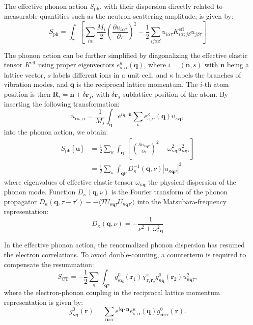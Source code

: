 \documentclass[%
 reprint,
superscriptaddress,
 amsmath,amssymb,
 aps,
prx,
]{revtex4-2}
\newcommand{\br}{\mathbf{r}}
\newcommand{\bR}{\mathbf{R}}
\newcommand{\bq}{\mathbf{q}}
\newcommand{\bn}{\mathbf{n}}
\newcommand{\bu}{\mathbf{u}}
\newcommand{\txe}{\text{e}}
\newcommand{\txph}{\text{ph}}
\newcommand{\txeff}{\text{eff}}
\newcommand{\txCT}{\text{CT}}
\begin{document}
\begin{appendices}
The effective phonon action $S_{\txph}$, with their dispersion directly related to measurable quantities such as the neutron scattering amplitude, is given by:
\begin{equation}
    S_{\txph} = \int_\tau \left[\sum_{i\alpha}\frac{M_i}{2}\left(\frac{\partial u_{i\alpha\tau}}{\partial\tau}\right)^2 - \frac{1}{2}\sum_{ij\alpha\beta} u_{i\alpha\tau} K^{\txeff}_{i\alpha;j\beta} u_{j\beta\tau} \right]
\end{equation}



The phonon action can be further simplified by diagonalizing the effective elastic tensor $K^{\txeff}$ using proper eigenvectors $e^\kappa_{s,\alpha}(\bq)$, where $i=(\bn,s)$ with $\bn$ being a lattice vector, $s$ labels different ions in a unit cell, and $\kappa$ labels the branches of vibration modes, and $\bq$ is the reciprocal lattice momentum. 
The $i$-th atom position is then $\bR_i = \bn + \delta\br_s$, with $\delta\br_s$ sublattice position of the atom.
By inserting the following transformation:
\begin{equation}
  {u}_{\bn s,\alpha}=\frac{1}{{M_s}}\int_{\bq}e^{i\bq\cdot\bn}\sum_{\kappa}e_{s,\alpha}^\kappa\left( \bq \right){u}_{\kappa\bq},
\end{equation}
into the phonon action, we obtain:
\begin{align}
\label{appeq:phonon_action}
    S_{\txph}[\bu] &= \frac{1}{2}\sum_{\kappa}\int_{\bq\tau}\left[\left(\frac{\partial u_{\kappa\bq\tau}}{\partial\tau}\right)^2 -  \omega_{\kappa\bq}^2 u_{\kappa\bq\tau}^2\right] \\
   & = \frac{1}{2}\sum_{\kappa}\int_{\bq\nu} D^{-1}_\kappa(\bq, \nu) \left|u_{\kappa\bq\nu}\right|^2
\end{align}
where eigenvalues of effective elastic tensor $\omega_{\kappa
\bq}$ the physical dispersion of the phonon mode.
Function $D_\kappa(\bq, \nu)$ is the Fourier transform of the phonon propagator $D_\kappa(\bq, \tau-\tau')\equiv -\langle TU_{\kappa\bq\tau}U_{\kappa\bq\tau'}\rangle$ into the Matsubara-frequency representation: 
\begin{equation}
D_\kappa(\bq, \nu)=-\frac{1}{\nu^2+\omega_{\kappa\bq}^2}
\end{equation}


In the effective phonon action, the renormalized phonon dispersion has resumed the electron correlations. To avoid double-counting, a counterterm is required to compensate the resummation:
\begin{equation}
\label{appeq:ct_action}
    S_{\txCT} = -\frac{1}{2}\sum_{\kappa}\int_{\bq\tau}  g^0_{\kappa\bq}(\br_1)\chi_{\br_1\br_2}^\txe g^0_{\kappa\bq}(\br_2 )u_{\kappa\bq\tau}^2,
\end{equation}
where the electron-phonon coupling in the reciprocal lattice momentum representation is given by:
\begin{equation}
    g^0_{\kappa\bq}(\br)=\sum_{\bn s\alpha}e^{i\bq\cdot \bn}e_{s,\alpha}^\kappa\left( \bq \right)g^0_{\bn s\alpha}(\br).
    \label{eq:epi_bare_fourier}
\end{equation}



\end{appendices}
\end{document}
